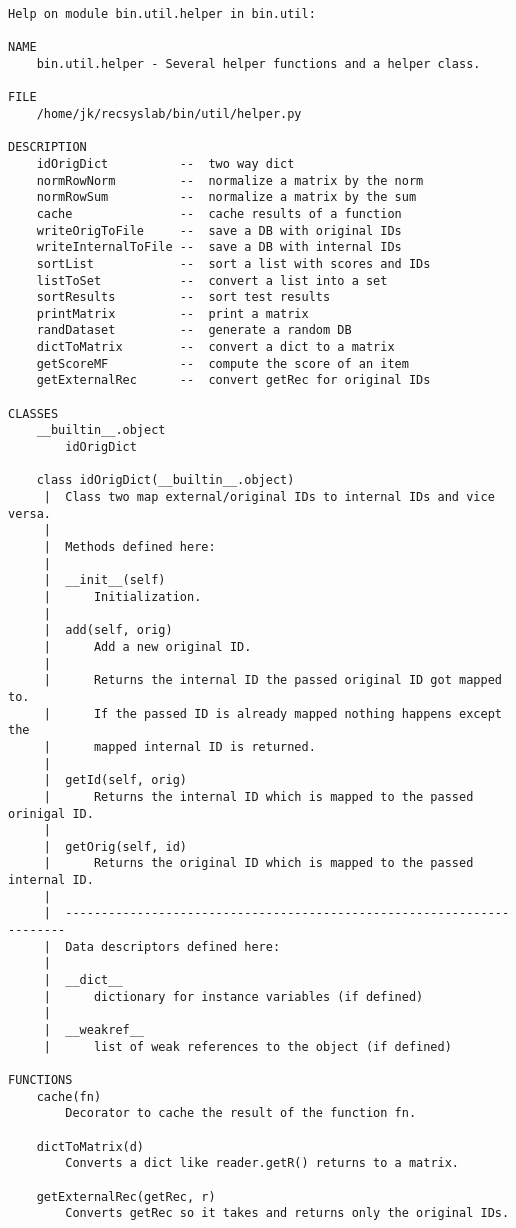 \begin{lstlisting}[style=docstring]
Help on module bin.util.helper in bin.util:

NAME
    bin.util.helper - Several helper functions and a helper class.

FILE
    /home/jk/recsyslab/bin/util/helper.py

DESCRIPTION
    idOrigDict          --  two way dict
    normRowNorm         --  normalize a matrix by the norm
    normRowSum          --  normalize a matrix by the sum
    cache               --  cache results of a function
    writeOrigToFile     --  save a DB with original IDs
    writeInternalToFile --  save a DB with internal IDs
    sortList            --  sort a list with scores and IDs
    listToSet           --  convert a list into a set
    sortResults         --  sort test results
    printMatrix         --  print a matrix
    randDataset         --  generate a random DB
    dictToMatrix        --  convert a dict to a matrix
    getScoreMF          --  compute the score of an item
    getExternalRec      --  convert getRec for original IDs

CLASSES
    __builtin__.object
        idOrigDict
    
    class idOrigDict(__builtin__.object)
     |  Class two map external/original IDs to internal IDs and vice versa.
     |  
     |  Methods defined here:
     |  
     |  __init__(self)
     |      Initialization.
     |  
     |  add(self, orig)
     |      Add a new original ID.
     |      
     |      Returns the internal ID the passed original ID got mapped to.
     |      If the passed ID is already mapped nothing happens except the
     |      mapped internal ID is returned.
     |  
     |  getId(self, orig)
     |      Returns the internal ID which is mapped to the passed orinigal ID.
     |  
     |  getOrig(self, id)
     |      Returns the original ID which is mapped to the passed internal ID.
     |  
     |  ----------------------------------------------------------------------
     |  Data descriptors defined here:
     |  
     |  __dict__
     |      dictionary for instance variables (if defined)
     |  
     |  __weakref__
     |      list of weak references to the object (if defined)

FUNCTIONS
    cache(fn)
        Decorator to cache the result of the function fn.
    
    dictToMatrix(d)
        Converts a dict like reader.getR() returns to a matrix.
    
    getExternalRec(getRec, r)
        Converts getRec so it takes and returns only the original IDs.
        

\end{lstlisting}
